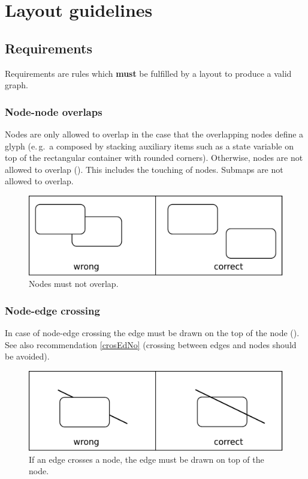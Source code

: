 \newpage

\section{Layout guidelines}

\subsection{Requirements}

Requirements are rules which \textbf{must} be fulfilled by a layout to produce a valid \SBGNERLone graph.

\subsubsection{Node-node overlaps}

Nodes are only allowed to overlap in the case that the overlapping nodes define a glyph (e.\,g.~a  composed by stacking auxiliary items such as a state variable on top of the rectangular container with rounded corners). Otherwise, nodes are not allowed to overlap (). This includes the
touching of nodes. Submaps are not allowed to overlap.

\begin{figure}[h!]
  \centering
  \includegraphics[scale=0.3]{images/layout-node-node}
  \caption{Nodes must not overlap.}\label{fig:layout1}
\end{figure}

\subsubsection{Node-edge crossing}\label{crosEdNoRe}

In case of node-edge crossing the edge must be drawn on the top of the node (). See also recommendation \ref{crosEdNo} (crossing between edges and nodes should be avoided).

\begin{figure}[h!]
  \centering
  \includegraphics[scale=0.3]{images/layout-node-edge}
  \caption{If an edge crosses a node, the edge must be drawn on top of the node.}\label{fig:layout2}
\end{figure}

